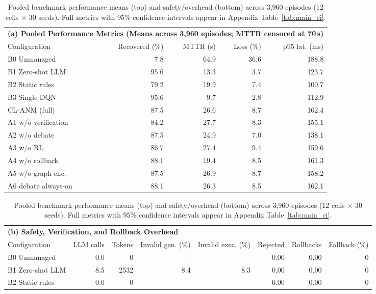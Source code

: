 \documentclass[sn-mathphys,Numbered]{sn-jnl}
\begin{document}
\begin{table}[t]\centering\footnotesize\setlength{\tabcolsep}{5pt}
\caption{Pooled benchmark performance means (top) and safety/overhead (bottom) across 3,960 episodes (12 cells $\times$ 30 seeds). Full metrics with 95\% confidence intervals appear in Appendix Table~\ref{tab:main_ci}.}\label{tab:main}\label{tab:over}%
\begin{adjustbox}{max width=\textwidth,center}
\begin{tabular}{lrrrr}
\toprule
\multicolumn{5}{l}{\textbf{(a) Pooled Performance Metrics (Means across 3,960 episodes; MTTR censored at 70\,s)}} \\
Configuration & Recovered (\%) & MTTR (s) & Loss (\%) & p95 lat. (ms) \\
\midrule
B0 Unmanaged & 7.8 & 64.9 & 36.6 & 188.8 \\
B1 Zero-shot LLM & 95.6 & 13.3 & 3.7 & 123.7 \\
B2 Static rules & 79.2 & 19.9 & 7.4 & 100.7 \\
B3 Single DQN & 95.6 & 9.7 & 2.8 & 112.9 \\
CL-ANM (full) & 87.5 & 26.6 & 8.7 & 162.4 \\
A1 w/o verification & 84.2 & 27.7 & 8.3 & 155.1 \\
A2 w/o debate & 87.5 & 24.9 & 7.0 & 138.1 \\
A3 w/o RL & 86.7 & 27.4 & 9.4 & 159.6 \\
A4 w/o rollback & 88.1 & 19.4 & 8.5 & 161.3 \\
A5 w/o graph enc. & 87.5 & 26.9 & 8.7 & 158.2 \\
A6 debate always-on & 88.1 & 26.3 & 8.5 & 162.1 \\
\bottomrule
\end{tabular}
\end{adjustbox}
\vspace{6pt}
\begin{adjustbox}{max width=\textwidth,center}
\begin{tabular}{lrrrrrrr}
\toprule
\multicolumn{8}{l}{\textbf{(b) Safety, Verification, and Rollback Overhead}} \\
Configuration & LLM calls & Tokens & Invalid gen. (\%) & Invalid exec. (\%) & Rejected & Rollbacks & Fallback (\%) \\
\midrule
B0 Unmanaged & 0.0 & 0 & -- & -- & 0.00 & 0.00 & 0 \\
B1 Zero-shot LLM & 8.5 & 2532 & 8.4 & 8.3 & 0.00 & 0.00 & 0 \\
B2 Static rules & 0.0 & 0 & -- & -- & 0.00 & 0.00 & 0 \\

\end{tabular}
\end{adjustbox}
\end{table}
\end{document}
